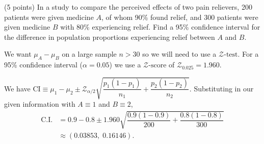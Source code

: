 (5 points) In a study to compare the perceived effects of two pain relievers, 200 patients
were given medicine $A$, of whom 90\% found relief, and 300 patients were given medicine
$B$ with 80\% experiencing relief. Find a 95\% confidence interval for the difference in
population proportions experiencing relief between $A$ and $B$.
\begin{mybox}
    We want $\mu_A - \mu_B$ on a large sample $n > 30$ so we will need to use a $\mathcal{Z}\text{-test}$. For a 95\% confidence interval ($\alpha = 0.05$) we use a $\mathcal{Z}\text{-score}$ of $\mathcal{Z}_{0.025} = 1.960$.
    
    \nl We have $\displaystyle \text{CI} \equiv \mu_1 - \mu_2 \pm \mathcal{Z}_{\alpha/2} \sqrt{\dfrac{p_1(1-p_1)}{n_1} + \dfrac{p_2(1-p_2)}{n_2}}$. Substituting in our given information with $A \equiv 1$ and $B \equiv 2$,
    \begin{align*}
        \text{C.I.} &= 0.9 - 0.8 \pm 1.960 \sqrt{\dfrac{0.9(1-0.9)}{200} + \dfrac{0.8(1-0.8)}{300}}\\
        &\approx (0.03853, \; 0.16146) .
    \end{align*}
\end{mybox}